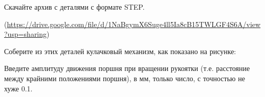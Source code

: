 
Скачайте архив с деталями с формате STEP. 

(\url{https://drive.google.com/file/d/1NaBgymX6Suge4ll5Ia8cB15TWLGF4S6A/view?usp=sharing}) 

Соберите из этих деталей кулачковый механизм, как показано на рисунке:


Введите амплитуду движения поршня при вращении рукоятки (т.е. расстояние между крайними положениями поршня), в мм, только число, с точностью не хуже 0.1.
